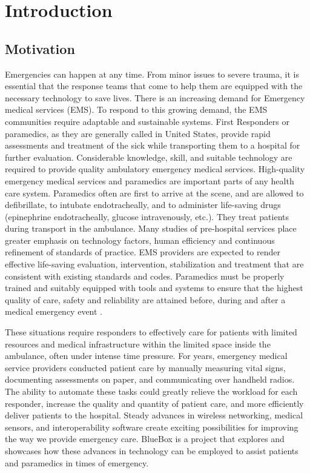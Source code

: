\chapter{Introduction}
\section{Motivation}


Emergencies can happen at any time. From minor issues to severe
trauma, it is essential that the response teams that come to help
them are equipped with the necessary technology to save lives. There
is an increasing demand for Emergency medical services (EMS). To
respond to this growing demand, the EMS communities require adaptable
and sustainable systems. First Responders or paramedics, as they are
generally called in United States, provide rapid assessments and
treatment of the sick while transporting them to a hospital for
further evaluation. Considerable knowledge, skill, and suitable
technology are required to provide quality ambulatory emergency
medical services. High-quality emergency medical services and
paramedics are important parts of any health care system. Paramedics
often are first to arrive at the scene, and are allowed to
defibrillate, to intubate endotracheally, and to administer
life-saving drugs (epinephrine endotracheally, glucose intravenously,
etc.). They treat patients during transport in the ambulance. Many
studies of pre-hospital services place greater emphasis on technology
factors, human efficiency and continuous refinement of standards of
practice. EMS providers are expected to render effective life-saving
evaluation, intervention, stabilization and treatment that are
consistent with existing standards and codes. Paramedics must be
properly trained and suitably equipped with tools and systems to
ensure that the highest quality of care, safety and reliability are
attained before, during and after a medical emergency event
\cite{EMS, EMS1, EMS2, EMS3}.

These situations require responders to effectively care for patients
with limited resources and medical infrastructure within the limited
space inside the ambulance, often under intense time pressure. For
years, emergency medical service providers conducted patient care by
manually measuring vital signs, documenting assessments on paper, and
communicating over handheld radios. The ability to automate these
tasks could greatly relieve the workload for each responder, increase
the quality and quantity of patient care, and more efficiently
deliver patients to the hospital.  Steady advances in wireless
networking, medical sensors, and interoperability software create
exciting possibilities for improving the way we provide emergency
care. BlueBox is a project that explores and showcases how these
advances in technology can be employed to assist patients and
paramedics in times of emergency. 

